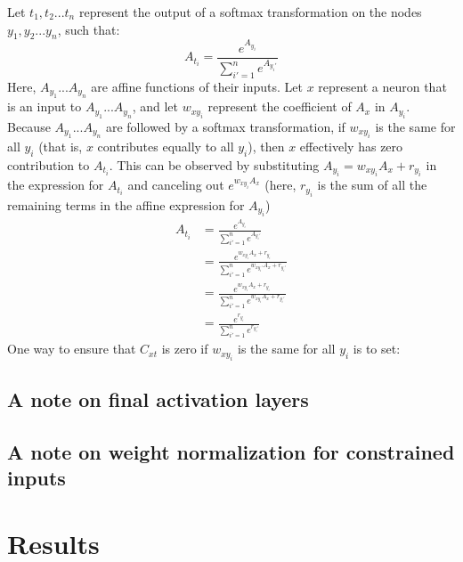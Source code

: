 \documentclass{article}
\begin{document}
Let ${t_1, t_2...t_n}$ represent the output of a softmax transformation on the nodes ${y_1, y_2...y_n}$, such that:
\begin{equation}
A_{t_i} = \frac{e^{A_{y_i}}}{\sum_{i' = 1}^n e^{A_{y_i'}}} 
\end{equation}
Here, $A_{y_1}...A_{y_n}$ are affine functions of their inputs. Let $x$ represent a neuron that is an input to $A_{y_1}...A_{y_n}$, and let $w_{xy_i}$ represent the coefficient of $A_x$ in $A_{y_i}$. Because $A_{y_1}...A_{y_n}$ are followed by a softmax transformation, if $w_{xy_i}$ is the same for all $y_i$ (that is, $x$ contributes equally to all $y_i$), then $x$ effectively has zero contribution to $A_{t_i}$. This can be observed by substituting $A_{y_i} = w_{xy_i}A_x + r_{y_i}$ in the expression for $A_{t_i}$ and canceling out $e^{w_{xy_i}A_x}$ (here, $r_{y_i}$ is the sum of all the remaining terms in the affine expression for $A_{y_i}$)
\begin{equation}
\begin{aligned}
A_{t_i} &= \frac{e^{A_{y_i}}}{\sum_{i' = 1}^n e^{A_{y_i'}}}\\
           &= \frac{e^{w_{xy_i}A_x + r_{y_i}}}{\sum_{i' = 1}^n e^{w_{xy_i'}A_x + r_{y_i'}}}\\
           &= \frac{e^{w_{xy_i}A_x + r_{y_i}}}{\sum_{i' = 1}^n e^{w_{xy_i}A_x + r_{y_i'}}}\\
           &= \frac{e^{r_{y_i}}}{\sum_{i' = 1}^n e^{r_{y_i'}}} 
\end{aligned}
\end{equation}
One way to ensure that $C_{xt}$ is zero if $w_{xy_i}$ is the same for all $y_i$ is to set:

\subsection{A note on final activation layers}

\subsection{A note on weight normalization for constrained inputs}

\section{Results}
\end{document}
